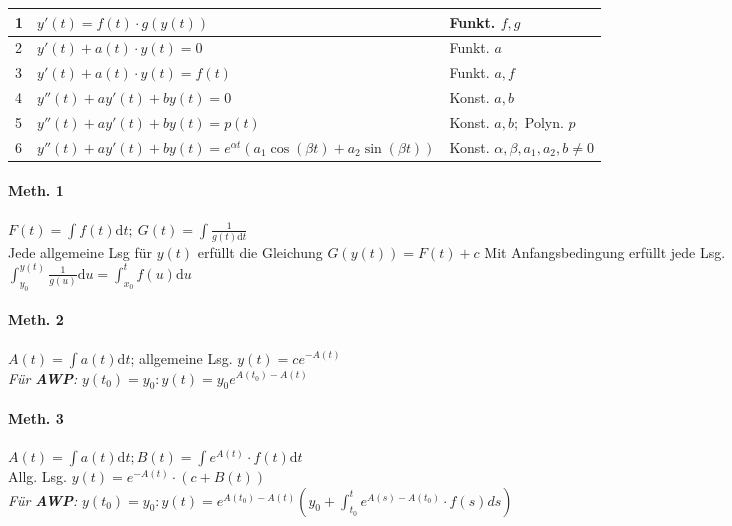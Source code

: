 \documentclass[paper=a3,paper=landscape, fontsize=9pt, DIV=30]{scrartcl}
\begin{document}
\begin{multicols*}{4}
  \begin{tabular}{|l| p{5cm}|l|}
    \hline
    1   & $y'(t)=f(t) \cdot g(y(t))$      & Funkt. $f,g$              \\ \hline
    2   & $y'(t)+a(t) \cdot y(t) = 0$     & Funkt. $a$                \\ \hline
    3   & $y'(t)+a(t) \cdot y(t) = f(t)$  & Funkt. $a,f$              \\ \hline
    4   & $y''(t)+ay'(t)+by(t) = 0$       & Konst. $a,b$              \\ \hline
    5   & $y''(t)+ay'(t)+by(t) = p(t)$    & Konst. $a,b;$ Polyn. $p$  \\ \hline
    6   & $y''(t)+ay'(t)+by(t) = e^{\alpha t} (a_1 \cos(\beta t)+ a_2 \sin(\beta t))$  & Konst. $\alpha,\beta,a_1, a_2,  b \neq 0$            \\ \hline
  \end{tabular}

  \paragraph{Meth. 1}
  $F(t)=\int f(t) \mathrm{d}t;\ G(t)=\int \frac{1}{g(t)\mathrm{d}t}$\\
  Jede allgemeine Lsg für $y(t)$ erfüllt die Gleichung $G(y(t))=F(t)+c$
  Mit Anfangsbedingung erfüllt jede Lsg. $\int_{y_0}^{y(t)}\frac{1}{g(u)}\mathrm{d}u=\int_{x_0}^{t}f(u)\mathrm{d}u$

  \paragraph{Meth. 2}
  $A(t)=\int a(t)\mathrm{d}t$; allgemeine Lsg. $y(t)=ce^{-A(t)}$\\
  \textit{Für \textbf{AWP}:} $y(t_0)=y_0: y(t)=y_0e^{A(t_0)-A(t)}$

  \paragraph{Meth. 3}
  $A(t)=\int a(t)\mathrm{d}t; B(t)=\int e^{A(t)} \cdot f(t) \mathrm{d}t$\\
  Allg. Lsg. $y(t)=e^{-A(t)} \cdot (c+B(t))$\\
  \textit{Für \textbf{AWP}:} $y(t_0)=y_0: y(t)=e^{A(t_0)-A(t)}(y_0+\int_{t_0}^{t}e^{A(s)-A(t_0)}\cdot f(s) ds)$


\end{multicols*}
\end{document}
